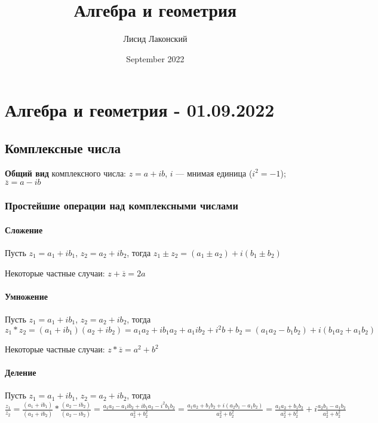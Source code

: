 \documentclass{article}
\title{Алгебра и геометрия}
\author{Лисид Лаконский}
\date{September 2022}
\begin{document}
\maketitle

\tableofcontents
\pagebreak

\section{Алгебра и геометрия - 01.09.2022}

\subsection{Комплексные числа}

\begin{flushleft}

\textbf{Общий вид} комплексного числа: $z = a + ib$, $i$ — мнимая единица ($i^2 = -1$); $\overline{z} = a - ib$

\subsubsection{Простейшие операции над комплексными числами}

\paragraph{Сложение}

Пусть $z_1 = a_1 + ib_1$, $z_2 = a_2 + ib_2$, тогда $z_1 \pm z_2 = (a_1 \pm a_2) + i(b_1 \pm b_2)$

Некоторые частные случаи: $z + \overline{z} = 2a$

\paragraph{Умножение}

Пусть $z_1 = a_1 + ib_1$, $z_2 = a_2 + ib_2$, тогда $z_1 * z_2 = (a_1 + ib_1)(a_2 + ib_2) = a_1a_2 + ib_1a_2 + a_1ib_2 + i^2b+b_2=(a_1a_2-b_1b_2) + i(b_1a_2 + a_1b_2)$

Некоторые частные случаи: $z * \overline{z} = a^2 + b^2$

\paragraph{Деление}

Пусть $z_1 = a_1 + ib_1$, $z_2 = a_2 + ib_2$, тогда $\frac{z_1}{z_2} = \frac{(a_1 + ib_1)}{(a_2 + ib_2)} * \frac{(a_2-ib_2)}{(a_2-ib_2)} = \frac{a_1a_2-a_1ib_2+ib_1a_2-i^2b_1b_2}{a_2^2+b_2^2} = \frac{a_1a_2 + b_1b_2 + i(a_2b_1 - a_1b_2)}{a_2^2+b_2^2} = \frac{a_1a_2+b_1b_2}{a_2^2+b_2^2}+i\frac{a_2b_1-a_1b_2}{a_2^2+b_2^2}$


\end{flushleft}
\end{document}
